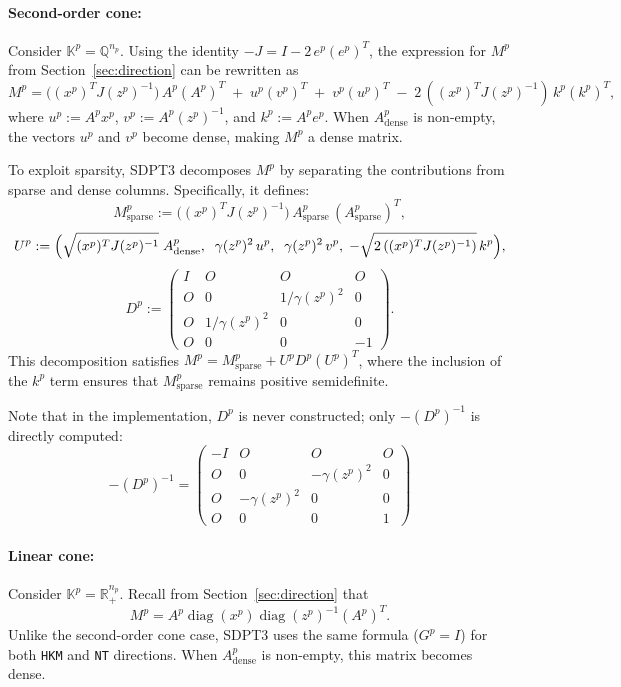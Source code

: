 \paragraph{Second-order cone:}
Consider $\mathbb{K}^p=\mathbb{Q}^{n_p}$. 
Using the identity $-J = I - 2\,e^p(e^p)^T$, 
the expression for $M^p$ from Section~\ref{sec:direction} can be rewritten as
\[
  M^p 
  = \bigl((x^p)^T J (z^p)^{-1}\bigr)\, A^p(A^p)^T
    \;+\; u^p (v^p)^T
    \;+\; v^p (u^p)^T
    \;-\; 2\,((x^p)^T J (z^p)^{-1})\, k^p (k^p)^T,
\]
where $u^p := A^p x^p$, $v^p := A^p (z^p)^{-1}$, and $k^p := A^p e^p$.
When $A^p_{\mathrm{dense}}$ is non-empty, the vectors $u^p$ and $v^p$ become dense, 
making $M^p$ a dense matrix.

To exploit sparsity, SDPT3 decomposes $M^p$ by separating the contributions 
from sparse and dense columns. Specifically, it defines:
\[
  M^p_{\mathrm{sparse}}
    := \bigl((x^p)^T J (z^p)^{-1}\bigr)\,
       A^p_{\mathrm{sparse}}\,(A^p_{\mathrm{sparse}})^T,
\]
\[
  U^p
    := \Bigl(\sqrt{(x^p)^T J (z^p)^{-1}}\;A^p_{\mathrm{dense}},
       \;\;\gamma(z^p)^2\,u^p,\;\;\gamma(z^p)^2\,v^p,
       \;-\sqrt{2\,((x^p)^T J (z^p)^{-1})}\,k^p\Bigr),
\]
\[
  D^p
    := \begin{pmatrix}
         I & O & O & O \\
         O & 0 & 1/\gamma(z^p)^2 & 0 \\
         O & 1/\gamma(z^p)^2 & 0 & 0 \\
         O & 0 & 0 & -1
       \end{pmatrix}.
\]
This decomposition satisfies $M^p = M^p_{\mathrm{sparse}} + U^p D^p (U^p)^T$, 
where the inclusion of the $k^p$ term ensures that $M^p_{\mathrm{sparse}}$ 
remains positive semidefinite.

Note that in the implementation, $D^p$ is never constructed; 
only $-(D^p)^{-1}$ is directly computed:
\[
  -(D^p)^{-1}
  = \begin{pmatrix}
      -I & O & O & O \\
      O & 0 & -\gamma(z^p)^2 & 0 \\
      O & -\gamma(z^p)^2 & 0 & 0 \\
      O & 0 & 0 & 1
    \end{pmatrix}
\]


\paragraph{Linear cone:}
Consider $\mathbb{K}^p = \mathbb{R}^{n_p}_+$. 
Recall from Section~\ref{sec:direction} that
\[
  M^p = A^p \operatorname{diag}(x^p) \operatorname{diag}(z^p)^{-1} (A^p)^T.
\]
Unlike the second-order cone case, SDPT3 uses the same formula ($G^p=I$) 
for both \texttt{HKM} and \texttt{NT} directions.
When $A^p_{\mathrm{dense}}$ is non-empty, this matrix becomes dense.


